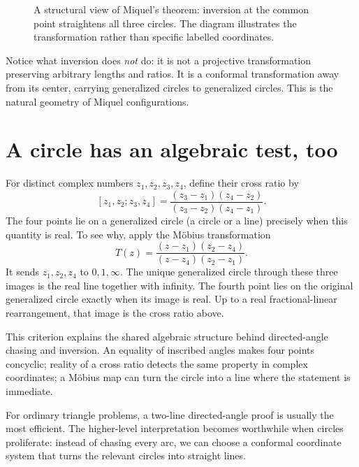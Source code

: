 \begin{figure}[H]
\centering
{}
\caption{A structural view of Miquel's theorem: inversion at the common point straightens all three circles. The diagram illustrates the transformation rather than specific labelled coordinates.}
\end{figure}

Notice what inversion does \emph{not} do: it is not a projective transformation preserving arbitrary lengths and ratios. It is a conformal transformation away from its center, carrying generalized circles to generalized circles. This is the natural geometry of Miquel configurations.

\section{A circle has an algebraic test, too}

For distinct complex numbers \(z_1,z_2,z_3,z_4\), define their cross ratio by
\[
 [z_1,z_2;z_3,z_4]
 =\frac{(z_3-z_1)(z_4-z_2)}
        {(z_3-z_2)(z_4-z_1)}.
\]
The four points lie on a generalized circle (a circle or a line) precisely when this quantity is real. To see why, apply the Möbius transformation
\[
 T(z)=\frac{(z-z_1)(z_2-z_4)}
            {(z-z_4)(z_2-z_1)}.
\]
It sends \(z_1,z_2,z_4\) to \(0,1,\infty\). The unique generalized circle through these three images is the real line together with infinity. The fourth point lies on the original generalized circle exactly when its image is real. Up to a real fractional-linear rearrangement, that image is the cross ratio above.

This criterion explains the shared algebraic structure behind directed-angle chasing and inversion. An equality of inscribed angles makes four points concyclic; reality of a cross ratio detects the same property in complex coordinates; a Möbius map can turn the circle into a line where the statement is immediate.

For ordinary triangle problems, a two-line directed-angle proof is usually the most efficient. The higher-level interpretation becomes worthwhile when circles proliferate: instead of chasing every arc, we can choose a conformal coordinate system that turns the relevant circles into straight lines.
